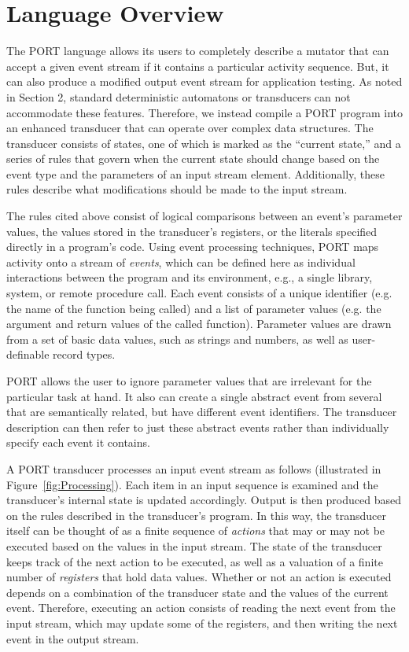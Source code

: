 \section{Language Overview}
\label{sec:Overview}

The PORT language allows its users
to completely describe a mutator
that can
accept a given event stream if it contains a particular
activity sequence. But, it can also produce a modified
output event stream
for application testing.
As noted in Section 2, standard
deterministic automatons or transducers can not accommodate these features.
Therefore, we instead compile a PORT program into
an  enhanced transducer that can operate over complex data structures.
The transducer consists of states, one of which is marked as the ``current state,'' and
a series of rules that govern when the current state should change based on the event type
and the parameters of an input stream element.
Additionally, these rules describe what modifications should be made to the input stream.

The rules cited above consist of logical comparisons between an event's parameter values, the values stored in the transducer's registers, or the literals specified directly in a program's code.
Using event processing techniques, PORT maps activity onto a
stream of \emph{events}, which can be defined here as individual interactions between the program and its environment, e.g.,
a single library, system, or remote procedure call.
Each event consists of a unique identifier (e.g. the name of the function being called) and a list of parameter values (e.g. the argument and return values of the called function).
Parameter values are drawn from a set of basic data values, such as strings and numbers, as well as user-definable record types.

PORT allows the user to ignore parameter values that are irrelevant for the particular task at hand.  It also can create a single abstract event from several that are semantically related, but have different event identifiers. The transducer description can then refer to just these abstract events rather than individually specify each event it contains.

A PORT transducer processes an input event stream as follows (illustrated in Figure~\ref{fig:Processing}).
Each item in an input
sequence is examined and the transducer's internal state is updated accordingly.
 Output is then produced based on the rules described in the transducer's program.
 In this way, 
 the transducer itself can be thought of as a finite sequence of \emph{actions}
 that may or may not be executed based on the values in the input stream. 
 The state of the transducer keeps track of the next action to be executed, as well as a valuation of a 
 finite number of \emph{registers} that hold data values.
 Whether or not an action is executed depends on a combination of the transducer state
 and the values of the current event.
 Therefore, executing an action consists of reading the next
event from the input stream, which may update some of the registers, and then writing the next event in the output stream.

